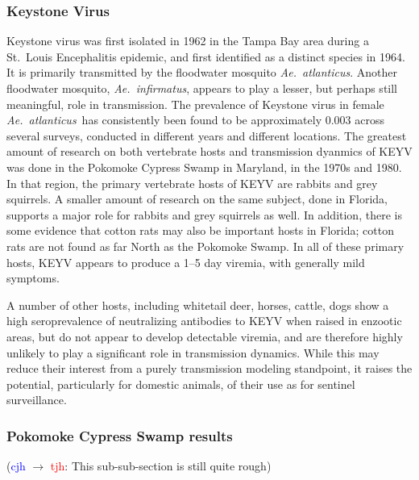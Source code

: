 \documentclass[12pt]{article}
\newcommand{\atl}{\textit{Ae.\ atlanticus}}
\newcommand{\cjh}{\textcolor{blue}{cjh}}
\newcommand{\tjh}{\textcolor{red}{tjh}}
\newcommand{\msg}[3]{(#1 $\rightarrow$ #2: #3)}
\newcommand{\mct}[1]{\msg\cjh\tjh{#1}}
\begin{document}
            \subsubsection{Keystone Virus}
                Keystone virus was first isolated in 1962 in the Tampa Bay area during a St.\ Louis Encephalitis epidemic\cite{chamberlain1969arbovirus, taylor1971california}, and first identified as a distinct species in 1964\cite{bond1966california}. It is primarily transmitted by the floodwater mosquito \atl. Another floodwater mosquito, \textit{Ae.~infirmatus}, appears to play a lesser, but perhaps still meaningful, role in transmission\cite{taylor1971california}. The prevalence of Keystone virus in female \atl\ has consistently been found to be approximately 0.003 across several surveys, conducted in different years and different locations\cite{watts1988maintenance,taylor1971california,leduc1975ecology,chamberlain1969arbovirus}. The greatest amount of research on both vertebrate hosts and transmission dyanmics of KEYV was done in the Pokomoke Cypress Swamp in Maryland, in the 1970s and 1980\cite{watts1988maintenance}. In that region, the primary vertebrate hosts of KEYV are rabbits and grey squirrels\cite{watts1988maintenance}. A smaller amount of research on the same subject, done in Florida, supports a major role for rabbits and grey squirrels as well.\cite{jennings1970tamiami,jennings1968california} In addition, there is some evidence that cotton rats may also be important hosts in Florida\cite{jennings1970tamiami,taylor1971california}; cotton rats are not found as far North as the Pokomoke Swamp\cite{watts1982serologic}. In all of these primary hosts, KEYV appears to produce a 1--5 day viremia\cite{watts1988maintenance,jennings1968california}, with generally mild symptoms\cite{asdf}. %

                A number of other hosts, including whitetail deer, horses, cattle, dogs show a high seroprevalence of neutralizing antibodies to KEYV when raised in enzootic areas, but do not appear to develop detectable viremia, and are therefore highly unlikely to play a significant role in transmission dynamics.\cite{parkin1973occurrence,watts1982serologic,watts1979experimental} While this may reduce their interest from a purely transmission modeling standpoint, it raises the potential, particularly for domestic animals, of their use as for sentinel surveillance.\cite{parkin1973occurrence}

            \subsubsection{Pokomoke Cypress Swamp results}
                \label{pokomoke-results}
                \mct{This sub-sub-section is still quite rough}
\end{document}

